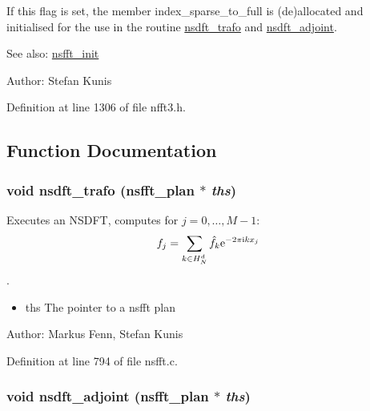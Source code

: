 If this flag is set, the member index\_\-sparse\_\-to\_\-full is (de)allocated and initialised for the use in the routine \hyperlink{group__nsfft_gd7ab4bcc35ad74e32af2abe42bc9e7f3}{nsdft\_\-trafo} and \hyperlink{group__nsfft_ge287757bca5164f2e5db7fe92ae1df13}{nsdft\_\-adjoint}. 

\begin{Desc}
\item[See also:]\hyperlink{group__nsfft_g1b7f87f960cb22420a933e915c539aaf}{nsfft\_\-init} \end{Desc}
\begin{Desc}
\item[Author:]Stefan Kunis \end{Desc}


Definition at line 1306 of file nfft3.h.

\subsection{Function Documentation}
\hypertarget{group__nsfft_gd7ab4bcc35ad74e32af2abe42bc9e7f3}{
\subsubsection{\setlength{\rightskip}{0pt plus 5cm}void nsdft\_\-trafo ({\bf nsfft\_\-plan} $\ast$ {\em ths})}}
\label{group__nsfft_gd7ab4bcc35ad74e32af2abe42bc9e7f3}


Executes an NSDFT, computes for $j=0,\hdots,M-1$: \[ f_j = \sum_{k\in H_N^d}\hat f_k {\rm e}^{-2\pi{\rm\scriptsize i}k x_j} \]. 

\begin{itemize}
\item ths The pointer to a nsfft plan\end{itemize}
\begin{Desc}
\item[Author:]Markus Fenn, Stefan Kunis \end{Desc}


Definition at line 794 of file nsfft.c.\hypertarget{group__nsfft_ge287757bca5164f2e5db7fe92ae1df13}{
\subsubsection{\setlength{\rightskip}{0pt plus 5cm}void nsdft\_\-adjoint ({\bf nsfft\_\-plan} $\ast$ {\em ths})}}
\label{group__nsfft_ge287757bca5164f2e5db7fe92ae1df13}


